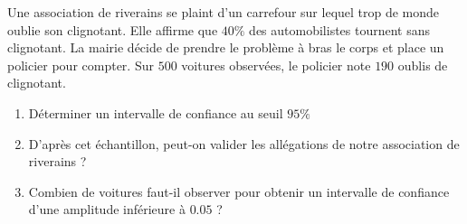 
\begin{exercice}\label{exosmath-0576}

    Une association de riverains se plaint d'un carrefour sur lequel trop de monde oublie son clignotant. Elle affirme que \( 40\%\) des automobilistes tournent sans clignotant. La mairie décide de prendre le problème à bras le corps et place un policier pour compter. Sur \( 500\) voitures observées, le policier note \( 190\) oublis de clignotant.
    \begin{enumerate}
        \item
            Déterminer un intervalle de confiance au seuil \( 95\%\)
        \item
            D'après cet échantillon, peut-on valider les allégations de notre association de riverains ?
        \item
            Combien de voitures faut-il observer pour obtenir un intervalle de confiance d'une amplitude inférieure à \( 0.05\) ?
    \end{enumerate}

\end{exercice}
